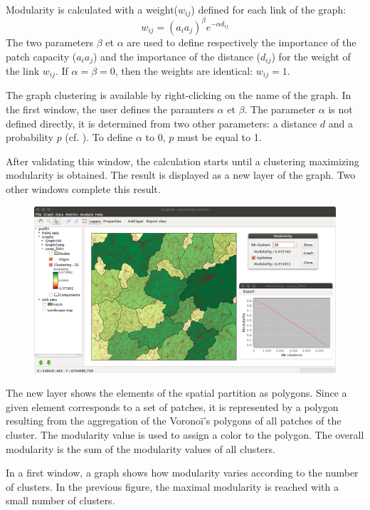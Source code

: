 \documentclass{article}
\begin{document}
Modularity is calculated with a weight($w_{ij}$) defined for each link of the graph:
$$w_{ij} = (a_i a_j)^\beta e^{-\alpha d_{ij}}$$
The two parameters $\beta$ et $\alpha$ are used to define respectively the importance of the patch capacity ($a_i a_j$) and the importance of the distance ($d_{ij}$) for the weight of the link $w_{ij}$. If $\alpha = \beta = 0$, then the weights are identical: $w_{ij} = 1$.  

The graph clustering is available by right-clicking on the name of the graph. In the first window, the user defines the paramters $\alpha$ et $\beta$. The parameter $\alpha$ is not defined directly, it is determined from two other parameters: a distance $d$ and a probability $p$ (cf. ). To define $\alpha$ to 0, $p$ must be equal to 1.

After validating this window, the calculation starts until a clustering maximizing modularity is obtained. The result is displayed as a new layer of the graph. Two other windows complete this result.

\begin{figure}[H]
	\includegraphics[scale=0.36]{img/manual-en_cluster.png} 
\end{figure}

The new layer shows the elements of the spatial partition as polygons. Since a given element corresponds to a set of patches, it is represented by a polygon resulting from the aggregation of the Voronoï’s polygons of all patches of the cluster. The modularity value is used to assign a color to the polygon. The overall modularity is the sum of the modularity values of all clusters. 

In a first window, a graph shows how modularity varies according to the number of clusters. In the previous figure, the maximal modularity is reached with a small number of clusters.
\end{document}
